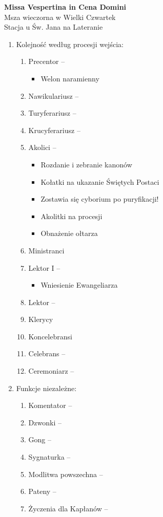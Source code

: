 \documentclass[10pt,oneside,final,notitlepage,a4paper,wide]{mwart}
\begin{document}
%
\begin{center}
	\LARGE{\textbf{Missa Vespertina in Cena Domini}}\\ \smallskip
	\small{Msza wieczorna w Wielki Czwartek\\ \smallskip Stacja u Św. Jana na Lateranie}
\end{center} \vspace{1cm}

\begin{enumerate}
	\item Kolejność według procesji wejścia:
	\begin{enumerate}
		\item Precentor --
			\begin{itemize}
				\item Welon naramienny
			\end{itemize}
		\item Nawikulariusz -- 
		\item Turyferariusz --
		\item Krucyferariusz --
		\item Akolici --
			\begin{itemize}
				\item Rozdanie i zebranie kanonów
				\item Kołatki na ukazanie Świętych Postaci
				\item Zostawia się cyborium po puryfikacji!
				\item Akolitki na procesji
				\item Obnażenie ołtarza
			\end{itemize}
		\item Ministranci
		\item Lektor I -- 
			\begin{itemize}
				\item Wniesienie Ewangeliarza
			\end{itemize}
		\item Lektor -- 
		\item Klerycy
		\item Koncelebransi
		\item Celebrans -- 
		\item Ceremoniarz -- 
\smallskip
	\end{enumerate}
	\item Funkcje niezależne:
	\begin{enumerate}
		\item Komentator -- 
		\item Dzwonki -- 
		\item Gong -- 
		\item Sygnaturka -- 
		\item Modlitwa powszechna -- 
		\item Pateny --
		\item Życzenia dla Kapłanów --
	\end{enumerate}
\end{enumerate}
\end{document}
